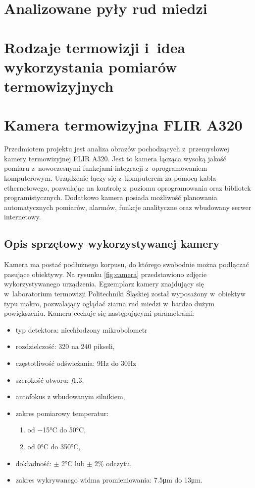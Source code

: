 \section{Analizowane pyły rud miedzi}

\section{Rodzaje termowizji i~idea wykorzystania pomiarów termowizyjnych}

\section{Kamera termowizyjna FLIR A320}
Przedmiotem projektu jest analiza obrazów pochodzących z~przemysłowej
kamery termowizyjnej FLIR A320.
Jest to kamera łącząca wysoką jakość pomiaru z~nowoczesnymi funkcjami
integracji z~oprogramowaniem komputerowym.
Urządzenie łączy się z~komputerem za pomocą kabla ethernetowego,
pozwalając na kontrolę z~poziomu oprogramowania oraz bibliotek
programistycznych.
Dodatkowo kamera posiada możliwość planowania automatycznych pomiarów,
alarmów, funkcje analityczne oraz wbudowany serwer internetowy.

\subsection{Opis sprzętowy wykorzystywanej kamery}
Kamera ma postać podłużnego korpusu, do którego swobodnie można podłączać
pasujące obiektywy.
Na rysunku \ref{fig:camera} przedstawiono zdjęcie wykorzystywanego urządzenia.
Egzemplarz kamery znajdujący się w~laboratorium termowizji Politechniki
Śląskiej został wyposażony w~obiektyw typu makro, pozwalający oglądać
ziarna rud miedzi w~bardzo dużym powiększeniu.
Kamera cechuje się następującymi parametrami:
\begin{itemize}
	\item typ detektora: niechłodzony mikrobolometr
	\item rozdzielczość: \num{320} na \num{240} pikseli,
	\item częstotliwość odświeżania: \num{9}\si{\hertz} do \num{30}\si{\hertz}
	\item szerokość otworu: \textit{f}\num{1,3},
	\item autofokus z wbudowanym silnikiem,
	\item zakres pomiarowy temperatur: 
		\begin{enumerate}
			\item od \num{-15}\si{\celsius} do \num{+50}\si{\celsius},
			\item od \num{0}\si{\celsius} do \num{350}\si{\celsius},
		\end{enumerate}
	\item dokładność: $\pm$ \num{2}\si{\celsius} lub $\pm$ \num{2}\% odczytu,
	\item zakres wykrywanego widma promieniowania: \num{7,5}\si{\micro\meter}
          do \num{13}\si{\micro\meter}.
\end{itemize}

